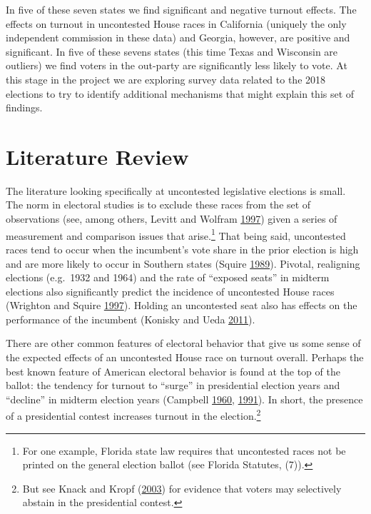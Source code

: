 \documentclass[
  12pt,
]{article}
\begin{document}
In five of these seven states we find significant and negative turnout effects. The effects on turnout in uncontested House races in California (uniquely the only independent commission in these data) and Georgia, however, are positive and significant. In five of these sevens states (this time Texas and Wisconsin are outliers) we find voters in the out-party are significantly less likely to vote. At this stage in the project we are exploring survey data related to the 2018 elections to try to identify additional mechanisms that might explain this set of findings.

\hypertarget{literature-review}{%
\section*{Literature Review}\label{literature-review}}

The literature looking specifically at uncontested legislative elections is small. The norm in electoral studies is to exclude these races from the set of observations (see, among others, Levitt and Wolfram \protect\hyperlink{ref-Levitt1997}{1997}) given a series of measurement and comparison issues that arise.\footnote{For one example, Florida state law requires that uncontested races not be printed on the general election ballot (see Florida Statutes, (7)).} That being said, uncontested races tend to occur when the incumbent's vote share in the prior election is high and are more likely to occur in Southern states (Squire \protect\hyperlink{ref-Squire1989}{1989}). Pivotal, realigning elections (e.g.~1932 and 1964) and the rate of ``exposed seats'' in midterm elections also significantly predict the incidence of uncontested House races (Wrighton and Squire \protect\hyperlink{ref-Wrighton1997}{1997}). Holding an uncontested seat also has effects on the performance of the incumbent (Konisky and Ueda \protect\hyperlink{ref-Konisky2011}{2011}).

There are other common features of electoral behavior that give us some sense of the expected effects of an uncontested House race on turnout overall. Perhaps the best known feature of American electoral behavior is found at the top of the ballot: the tendency for turnout to ``surge'' in presidential election years and ``decline'' in midterm election years (Campbell \protect\hyperlink{ref-Campbell1960}{1960}, \protect\hyperlink{ref-Campbell1991}{1991}). In short, the presence of a presidential contest increases turnout in the election.\footnote{But see Knack and Kropf (\protect\hyperlink{ref-Knack2003}{2003}) for evidence that voters may selectively abstain in the presidential contest.}
\end{document}

